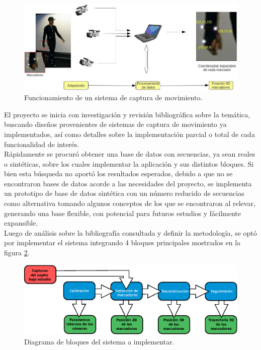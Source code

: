 \begin{figure}[ht!]
\begin{center}
\includegraphics[scale=0.4]{img/Sistema_completo/diagrama_abuelas_1.jpg}
\end{center}
\caption{Funcionamiento de un sistema de captura de movimiento.}
\label{abuela1}
\end{figure}


El proyecto se inicia con investigación y revisión bibliográfica sobre la temática, buscando diseños provenientes de sistemas de captura de movimiento ya implementados, así como  detalles sobre la implementación parcial o total de cada funcionalidad de interés. 
\\ 

Rápidamente se procuró obtener una base de datos con secuencias, ya sean reales o sintéticas, sobre los cuales implementar la aplicación y sus distintos bloques. Si bien esta búsqueda no aportó los resultados esperados,
 debido a que no se encontraron bases de datos acorde a las necesidades del proyecto, se implementa un prototipo de base de datos sintética con un número reducido de secuencias como alternativa tomando algunos conceptos de los que se encontraron al relevar, generando una base flexible, con potencial para futuros estudios y fácilmente expansible.
\\ 

 Luego de análisis sobre la bibliografía consultada y definir la metodología, se optó por implementar el sistema integrando 4 bloques principales mostrados en la figura \ref{bloquesSistintro}. 

 \begin{figure}[H]
\begin{center}
\includegraphics[scale=0.7]{img/Sistema_completo/Diagrama_de_bloques.eps}
\end{center}
\caption{Diagrama de bloques del sistema a implementar.}
\label{bloquesSistintro}
\end{figure}

